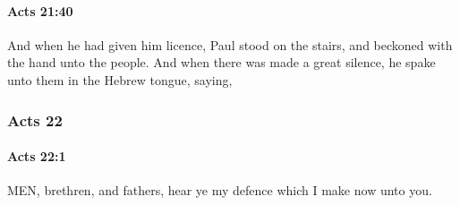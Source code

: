 		\paragraph{Acts 21:40} %
			\label{ACTS-21-40}

			And when he had given him licence, Paul stood on the stairs, and beckoned with the hand unto the people.  And when there was made a great silence, he spake unto them in the Hebrew tongue, saying,

			\begin{framed}
			\scriptsize
				\begin{compactdesc}
					\item[SBLG] 
				\end{compactdesc}
			\end{framed}

	\subsubsection{Acts 22} %
		\label{ACTS-22}
		
		\paragraph{Acts 22:1} %
			\label{ACTS-22-1}

			MEN, brethren, and fathers, hear ye my defence which I make now unto you.

